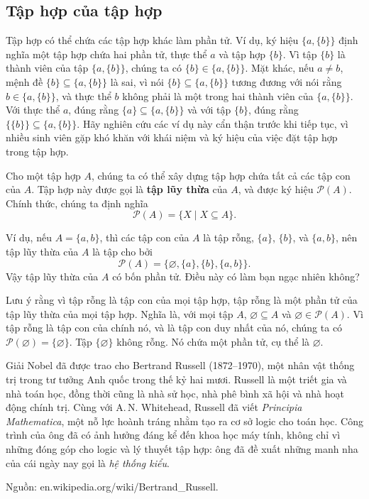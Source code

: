 \subsection{Tập hợp của tập hợp}

Tập hợp có thể chứa các tập hợp khác làm phần tử. Ví dụ, ký hiệu $\{a, \{b\}\}$ định nghĩa một tập hợp chứa hai phần tử, thực thể $a$ và tập hợp $\{b\}$. Vì tập $\{b\}$ là thành viên của tập $\{a, \{b\}\}$, chúng ta có $\{b\} \in \{a, \{b\}\}$. Mặt khác, nếu $a \neq b$, mệnh đề $\{b\} \subseteq \{a, \{b\}\}$ là sai, vì nói $\{b\} \subseteq \{a, \{b\}\}$ tương đương với nói rằng $b \in \{a, \{b\}\}$, và thực thể $b$ không phải là một trong hai thành viên của $\{a, \{b\}\}$. Với thực thể $a$, đúng rằng $\{a\} \subseteq \{a, \{b\}\}$ và với tập $\{b\}$, đúng rằng $\{\{b\}\} \subseteq \{a, \{b\}\}$. Hãy nghiên cứu các ví dụ này cẩn thận trước khi tiếp tục, vì nhiều sinh viên gặp khó khăn với khái niệm và ký hiệu của việc đặt tập hợp trong tập hợp.

Cho một tập hợp $A$, chúng ta có thể xây dựng tập hợp chứa tất cả các tập con của $A$. Tập hợp này được gọi là \textbf{tập lũy thừa} của $A$, và được ký hiệu $\mathcal{P}(A)$. Chính thức, chúng ta định nghĩa
\[
\mathcal{P}(A) = \{X \mid X \subseteq A\}.
\]

\begin{example}
Ví dụ, nếu $A = \{a, b\}$, thì các tập con của $A$ là tập rỗng, $\{a\}$, $\{b\}$, và $\{a, b\}$, nên tập lũy thừa của $A$ là tập cho bởi
\[
\mathcal{P}(A) = \{\varnothing, \{a\}, \{b\}, \{a, b\}\}.
\]
Vậy tập lũy thừa của $A$ có bốn phần tử. Điều này có làm bạn ngạc nhiên không?
\end{example}

Lưu ý rằng vì tập rỗng là tập con của mọi tập hợp, tập rỗng là một phần tử của tập lũy thừa của mọi tập hợp. Nghĩa là, với mọi tập $A$, $\varnothing \subseteq A$ và $\varnothing \in \mathcal{P}(A)$. Vì tập rỗng là tập con của chính nó, và là tập con duy nhất của nó, chúng ta có $\mathcal{P}(\varnothing) = \{\varnothing\}$. Tập $\{\varnothing\}$ không rỗng. Nó chứa một phần tử, cụ thể là $\varnothing$.

\begin{infobox}
Giải Nobel đã được trao cho Bertrand Russell (1872--1970), một nhân vật thống trị trong tư tưởng Anh quốc trong thế kỷ hai mươi. Russell là một triết gia và nhà toán học, đồng thời cũng là nhà sử học, nhà phê bình xã hội và nhà hoạt động chính trị. Cùng với A.\,N. Whitehead, Russell đã viết \textit{Principia Mathematica}, một nỗ lực hoành tráng nhằm tạo ra cơ sở logic cho toán học. Công trình của ông đã có ảnh hưởng đáng kể đến khoa học máy tính, không chỉ vì những đóng góp cho logic và lý thuyết tập hợp: ông đã đề xuất những manh nha của cái ngày nay gọi là \textit{hệ thống kiểu}.

\noindent Nguồn: en.wikipedia.org/wiki/Bertrand\_Russell.
\end{infobox}

